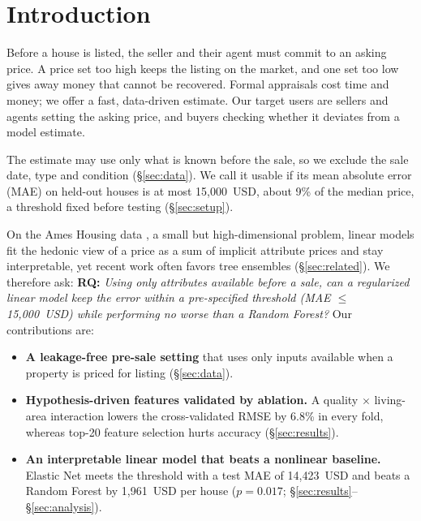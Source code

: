 \section{Introduction}
\label{sec:intro}

Before a house is listed, the seller and their agent must commit to an asking price.
A price set too high keeps the listing on the market, and one set too low gives away money that cannot be recovered.
Formal appraisals cost time and money; we offer a fast, data-driven estimate.
Our target users are sellers and agents setting the asking price, and buyers checking whether it deviates from a model estimate.

The estimate may use only what is known before the sale, so we exclude the sale date, type and condition (\S\ref{sec:data}).
We call it usable if its mean absolute error (MAE) on held-out houses is at most 15{,}000~USD, about 9\% of the median price, a threshold fixed before testing (\S\ref{sec:setup}).

On the Ames Housing data \citep{decock2011ames}, a small but high-dimensional problem, linear models fit the hedonic view of a price as a sum of implicit attribute prices \citep{rosen1974hedonic} and stay interpretable, yet recent work often favors tree ensembles (\S\ref{sec:related}).
We therefore ask:
\textbf{RQ:} \emph{Using only attributes available before a sale, can a regularized linear model keep the error within a pre-specified threshold (MAE $\leq$ 15{,}000~USD) while performing no worse than a Random Forest?}
Our contributions are:
\begin{itemize}
  \item \textbf{A leakage-free pre-sale setting} that uses only inputs available when a property is priced for listing (\S\ref{sec:data}).
  \item \textbf{Hypothesis-driven features validated by ablation.} A quality $\times$ living-area interaction lowers the cross-validated RMSE by 6.8\% in every fold, whereas top-20 feature selection hurts accuracy (\S\ref{sec:results}).
  \item \textbf{An interpretable linear model that beats a nonlinear baseline.} Elastic Net meets the threshold with a test MAE of 14{,}423~USD and beats a Random Forest by 1{,}961~USD per house ($p = 0.017$; \S\ref{sec:results}--\S\ref{sec:analysis}).
\end{itemize}
